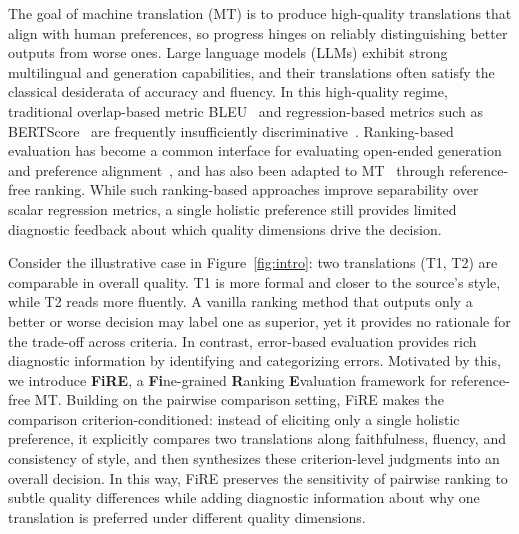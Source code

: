 \documentclass{article}
\theoremstyle{plain}
\theoremstyle{definition}
\theoremstyle{remark}
\newcommand{\oursx}{FiRE}
\newcommand{\ours}{FiRE }
\begin{document}
The goal of machine translation (MT) is to produce high-quality translations that align with human preferences, so progress hinges on reliably distinguishing better outputs from worse ones. Large language models (LLMs) exhibit strong multilingual and generation capabilities, and their translations often satisfy the classical desiderata of accuracy and fluency. In this high-quality regime, traditional overlap-based metric BLEU~\citep{Papineni2002BleuAM} and regression-based metrics such as BERTScore~\citep{Zhang2019BERTScoreET} are frequently insufficiently discriminative~\citep{freitag2022results}. 
Ranking-based evaluation has become a common interface for evaluating open-ended generation and preference alignment~\citep{wang2023pandalm,ChatbotArena,DBLP:conf/iclr/LiSYF0024,DBLP:conf/iclr/ZhuWW25,DBLP:conf/iclr/YeLLA0SYL25}, and has also been adapted to MT~\citep{MT-RANKER,Song2025EnhancingHE} through reference-free ranking. While such ranking-based approaches improve separability over scalar regression metrics, a single holistic preference still provides limited diagnostic feedback about which quality dimensions drive the decision.

Consider the illustrative case in Figure~\ref{fig:intro}: two translations (T1, T2) are comparable in overall quality. T1 is more formal and closer to the source’s style, while T2 reads more fluently. A vanilla ranking method that outputs only a better or worse decision may label one as superior, yet it provides no rationale for the trade-off across criteria.
In contrast, error-based evaluation provides rich diagnostic information by identifying and categorizing errors. 
Motivated by this, we introduce \textbf{\oursx}, a \textbf{Fi}ne-grained \textbf{R}anking \textbf{E}valuation framework for reference-free MT. Building on the pairwise comparison setting, FiRE makes the comparison criterion-conditioned: instead of eliciting only a single holistic preference, it explicitly compares two translations along faithfulness, fluency, and consistency of style, and then synthesizes these criterion-level judgments into an overall decision. In this way, \ours preserves the sensitivity of pairwise ranking to subtle quality differences while adding diagnostic information about why one translation is preferred under different quality dimensions. 
\end{document}
